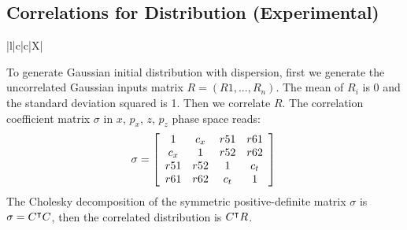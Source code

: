 \subsection{Correlations for  Distribution (Experimental)}

\begin{table}[!htb]
  \begin{center}\footnotesize
    \caption{Definition of additional distribution attributes for a 
      distribution type for generating correlations in the beam.}
    \label{tab:distattrcorrgauss}
    \begin{tabularx}{\textwidth-1cm}{|l|c|c|X|}
      \hline
      \hline
      \hline
    \end{tabularx}
  \end{center}
\end{table}

To generate Gaussian initial distribution with dispersion, first we generate the uncorrelated Gaussian inputs matrix
$R=(R1,...,R_n)$. The mean of $R_i$ is $0$ and the standard deviation squared is 1. Then we correlate $R$.
The correlation coefficient matrix $\sigma$ in $x$, $p_x$, $z$, $p_z$ phase space reads: \\

\begin{equation*}
\sigma= \left[
\begin{array}{cccc}
1    &c_x&r51    &r61\\
c_x&1    &r52    &r62\\
r51  &r52  &1      &c_t\\
r61  &r62  &c_t  &1\\
\end{array}
\right] \\
\end{equation*}
The Cholesky decomposition of the symmetric positive-definite matrix $\sigma$ is $\sigma=C^\intercal C$, then the correlated
distribution is $C^\intercal R$.

